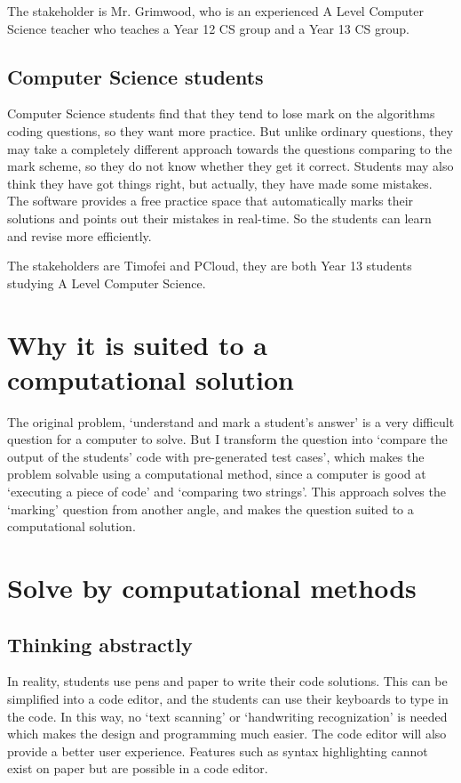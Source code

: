 \documentclass[a4paper]{report}
\begin{document}
The stakeholder is Mr. Grimwood, who is an experienced A Level Computer Science teacher who teaches a Year 12 CS group and a Year 13 CS group.

\subsection{Computer Science students}

Computer Science students find that they tend to lose mark on the algorithms coding questions, so they want more practice. But unlike ordinary questions, they may take a completely different approach towards the questions comparing to the mark scheme, so they do not know whether they get it correct. Students may also think they have got things right, but actually, they have made some mistakes. The software provides a free practice space that automatically marks their solutions and points out their mistakes in real-time. So the students can learn and revise more efficiently.

The stakeholders are Timofei and PCloud, they are both Year 13 students studying A Level Computer Science.

\section{Why it is suited to a computational solution}

The original problem, `understand and mark a student's answer' is a very difficult question for a computer to solve. But I transform the question into `compare the output of the students' code with pre-generated test cases', which makes the problem solvable using a computational method, since a computer is good at `executing a piece of code' and `comparing two strings'. This approach solves the `marking' question from another angle, and makes the question suited to a computational solution.

\section{Solve by computational methods}

\subsection{Thinking abstractly}

In reality, students use pens and paper to write their code solutions. This can be simplified into a code editor, and the students can use their keyboards to type in the code. In this way, no `text scanning' or `handwriting recognization' is needed which makes the design and programming much easier. The code editor will also provide a better user experience. Features such as syntax highlighting cannot exist on paper but are possible in a code editor.
\end{document}
